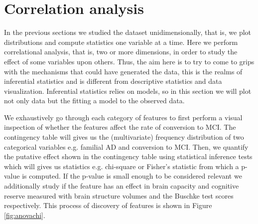 \documentclass[11pt]{article}
\theoremstyle{definition}
\theoremstyle{remark}
\begin{document}

\section{Correlation analysis}
\label{se:met}

In the previous sections we studied the dataset unidimensionally, that is, we plot distributions and compute statistics one variable at a time. Here we perform correlational analysis, that is, two or more dimensions, in order to study the effect of some variables upon others. Thus, the aim here is to try to come to grips with the mechanisms that could have generated the data, this is the realms of inferential statistics and is different from descriptive statistics and data visualization. Inferential statistics relies on models, so in this section we will plot not only data but the fitting a model to the observed data.

We exhaustively go through each category of features to first perform a visual inspection of whether the features affect the rate of conversion to MCI. The contingency table will gives us the (multivariate) frequency distribution of two categorical variables e.g. familial AD and conversion to MCI. Then, we quantify the putative effect shown in the contingency table  using statistical inference tests which will gives us statistics e.g. chi-square or Fisher's statistic from which a p-value is computed. If the p-value is small enough to be considered relevant we additionally study if the feature has an effect in brain capacity and cognitive reserve measured with brain structure volumes and the Buschke test scores respectively.
This process of discovery of features is shown in Figure \ref{fig:anovachi}.

\end{document}
